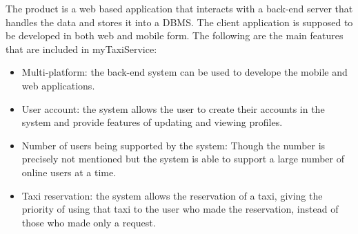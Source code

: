The product is a web based application that interacts with a back-end server that handles the data and stores it into a DBMS.
The client application is supposed to be developed in both web and mobile form.
The following are the main features that are included in myTaxiService:
\begin{itemize}
    \item Multi-platform: the back-end system can be used to develope the mobile and web applications.
    \item User account: the system allows the user to create their accounts in the system and provide features of updating and viewing profiles.
    \item Number of users being supported by the system: Though the number is precisely not mentioned but the system is able to support a large number of online users at a time.
    \item Taxi reservation: the system allows the reservation of a taxi, giving the priority of using that taxi to the user  who made the reservation, instead of those who made only a request.
\end{itemize}